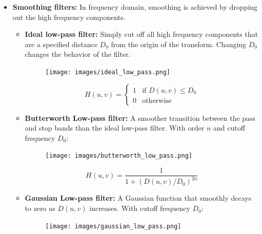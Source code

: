 \begin{itemize}
  \item \textbf{Smoothing filters:} In frequency domain, smoothing is achieved by dropping out the high frequency components.
    \begin{itemize}
      \item \textbf{Ideal low-pass filter:} Simply cut off all high
        frequency components that are a specified distance $D_0$ from the
        origin of the transform. Changing $D_0$ changes the behavior of the filter.

        \begin{minipage}{\linewidth}
          \begin{figure}[H]
            \centering
            \texttt{[image: images/ideal\_low\_pass.png]}
          \end{figure}
        \end{minipage}

        \begin{equation*}
          H(u, v) =
          \begin{cases}
            1 & \text{if } D(u, v) \leq D_0 \\
            0 & \text{otherwise}
          \end{cases}
        \end{equation*}

      \item \textbf{Butterworth Low-pass filter:} A smoother
        transition between the pass and stop bands than the ideal low-pass
        filter. With order $n$ and cutoff frequency $D_0$:

        \begin{minipage}{\linewidth}
          \begin{figure}[H]
            \centering
            \texttt{[image: images/butterworth\_low\_pass.png]}
          \end{figure}
        \end{minipage}

        \begin{equation*}
          H(u, v) = \frac{1}{1 + (D(u, v)/D_0)^{2n}}
        \end{equation*}

      \item \textbf{Gaussian Low-pass filter:} A Gaussian function
        that smoothly decays to zero as $D(u, v)$ increases. With cutoff
        frequency $D_0$:

        \begin{minipage}{\linewidth}
          \begin{figure}[H]
            \centering
            \texttt{[image: images/gaussian\_low\_pass.png]}
          \end{figure}
        \end{minipage}


\end{itemize}
\end{itemize}
